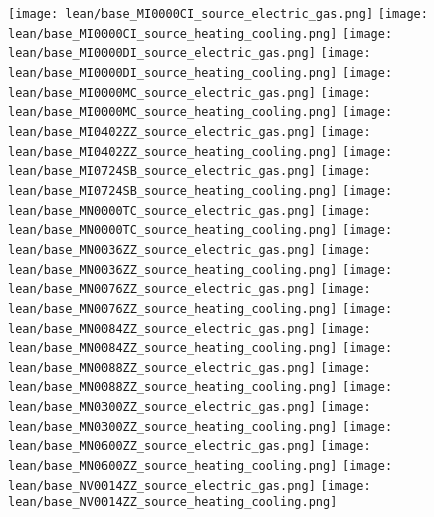 \texttt{[image: lean/base\_MI0000CI\_source\_electric\_gas.png]}
\texttt{[image: lean/base\_MI0000CI\_source\_heating\_cooling.png]}
\texttt{[image: lean/base\_MI0000DI\_source\_electric\_gas.png]}
\texttt{[image: lean/base\_MI0000DI\_source\_heating\_cooling.png]}
\texttt{[image: lean/base\_MI0000MC\_source\_electric\_gas.png]}
\texttt{[image: lean/base\_MI0000MC\_source\_heating\_cooling.png]}
\texttt{[image: lean/base\_MI0402ZZ\_source\_electric\_gas.png]}
\texttt{[image: lean/base\_MI0402ZZ\_source\_heating\_cooling.png]}
\texttt{[image: lean/base\_MI0724SB\_source\_electric\_gas.png]}
\texttt{[image: lean/base\_MI0724SB\_source\_heating\_cooling.png]}
\texttt{[image: lean/base\_MN0000TC\_source\_electric\_gas.png]}
\texttt{[image: lean/base\_MN0000TC\_source\_heating\_cooling.png]}
\texttt{[image: lean/base\_MN0036ZZ\_source\_electric\_gas.png]}
\texttt{[image: lean/base\_MN0036ZZ\_source\_heating\_cooling.png]}
\texttt{[image: lean/base\_MN0076ZZ\_source\_electric\_gas.png]}
\texttt{[image: lean/base\_MN0076ZZ\_source\_heating\_cooling.png]}
\texttt{[image: lean/base\_MN0084ZZ\_source\_electric\_gas.png]}
\texttt{[image: lean/base\_MN0084ZZ\_source\_heating\_cooling.png]}
\texttt{[image: lean/base\_MN0088ZZ\_source\_electric\_gas.png]}
\texttt{[image: lean/base\_MN0088ZZ\_source\_heating\_cooling.png]}
\texttt{[image: lean/base\_MN0300ZZ\_source\_electric\_gas.png]}
\texttt{[image: lean/base\_MN0300ZZ\_source\_heating\_cooling.png]}
\texttt{[image: lean/base\_MN0600ZZ\_source\_electric\_gas.png]}
\texttt{[image: lean/base\_MN0600ZZ\_source\_heating\_cooling.png]}
\texttt{[image: lean/base\_NV0014ZZ\_source\_electric\_gas.png]}
\texttt{[image: lean/base\_NV0014ZZ\_source\_heating\_cooling.png]}
